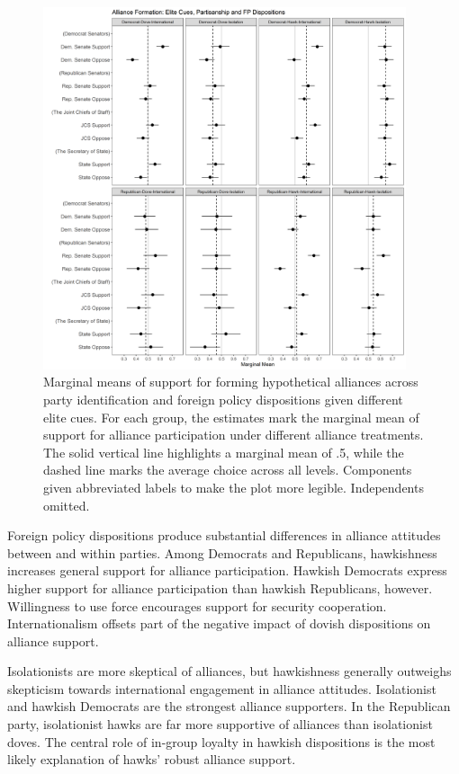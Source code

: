 \documentclass[12pt]{article}
\begin{document}
\begin{figure}[htpb]
	\centering
		\includegraphics[width=0.95\textwidth]{../figures/party-dispo-form-el.png}
	\caption{Marginal means of support for forming hypothetical alliances across party identification and foreign policy dispositions given different elite cues. For each group, the estimates mark the marginal mean of support for alliance participation under different alliance treatments. The solid vertical line highlights a marginal mean of .5, while the dashed line marks the average choice across all levels. Components given abbreviated labels to make the plot more legible. Independents omitted.}
	\label{fig:party-dispo-form-el}
\end{figure}


Foreign policy dispositions produce substantial differences in alliance attitudes between and within parties. 
Among Democrats and Republicans, hawkishness increases general support for alliance participation.
Hawkish Democrats express higher support for alliance participation than hawkish Republicans, however. 
Willingness to use force encourages support for security cooperation. 
Internationalism offsets part of the negative impact of dovish dispositions on alliance support. 


Isolationists are more skeptical of alliances, but hawkishness generally outweighs skepticism towards international engagement in alliance attitudes. 
Isolationist and hawkish Democrats are the strongest alliance supporters. 
In the Republican party, isolationist hawks are far more supportive of alliances than isolationist doves.
The central role of in-group loyalty in hawkish dispositions \citep{Kertzeretal2014} is the most likely explanation of hawks' robust alliance support. 
\end{document}
